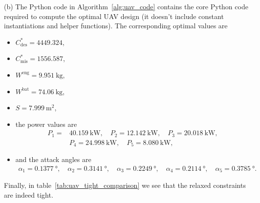 \documentclass[12pt,reqno]{article}
\theoremstyle{definition}
\numberwithin{equation}{section}
\begin{document}
    \vspace{0.3cm}
    \noindent (b) The Python code in Algorithm~\ref{alg:uav_code} contains the core Python code
    required to compute the optimal UAV design (it doesn't include constant instantiations and helper functions).
    The corresponding optimal values are
    \begin{itemize}
        \item $C^{*}_{\mathrm{des}} = 4449.324$,
        \item $C^{*}_{\mathrm{mis}} = 1556.587$,
        \item $W^{\mathrm{eng}} = \SI{9.951}{\kilo\gram}$,
        \item $W^{\mathrm{bat}} = \SI{74.06}{\kilo\gram}$,
        \item $S = \SI{7.999}{\square\meter}$,
        \item the power values are
            \[
            \begin{aligned}P_1 = &\SI{40.159}{\kilo\watt}, \quad
            P_2 = \SI{12.142}{\kilo\watt}, \quad
            P_3 = \SI{20.018}{\kilo\watt}, \\
            &P_4 = \SI{24.998}{\kilo\watt}, \quad
            P_5 = \SI{8.080}{\kilo\watt},
            \end{aligned}
            \]
        \item and the attack angles are
        \[
            \begin{aligned}
            \alpha_1 = \SI{0.1377}{\degree}, \quad
            \alpha_2 = \SI{0.3141}{\degree}, \quad
            \alpha_3 = \SI{0.2249}{\degree}, \quad
            \alpha_4 = \SI{0.2114}{\degree}, \quad
            \alpha_5 = \SI{0.3785}{\degree}.
            \end{aligned}
            \]
    \end{itemize}
    Finally, in table~\ref{tab:uav_tight_comparison} we see that the relaxed constraints are indeed tight.
\end{document}
